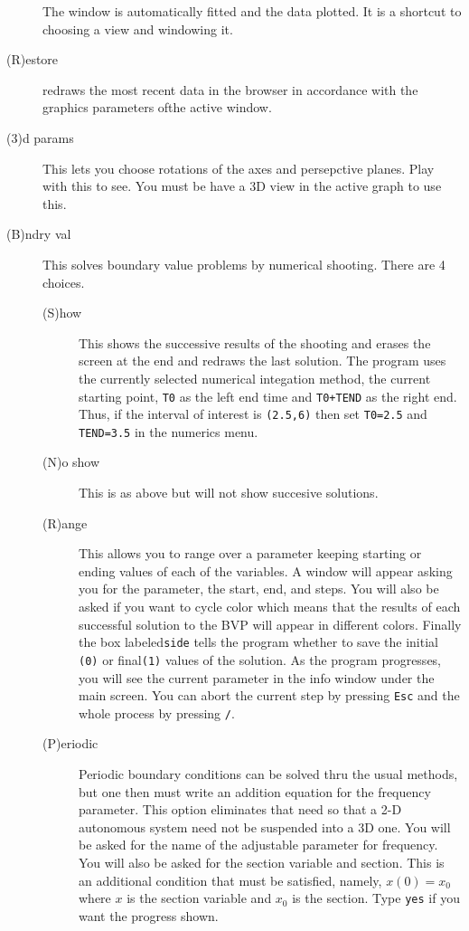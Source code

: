 \begin{description}
 The window is automatically fitted and the data plotted.  It is a
shortcut to choosing a view and windowing it.
\item[(R)estore] redraws the most recent data in the browser in accordance with the
 graphics parameters ofthe active window.
\item[(3)d params]  This lets you choose rotations of the axes and
persepctive  planes. 
 Play with this to see. You must be have a 3D view in the active graph
to use this.
\item[(B)ndry val]  This solves boundary value problems by numerical shooting. There
 are 4 choices.
\begin{description}
\item[(S)how]  This shows the successive results of the shooting and 
erases the screen at the end and redraws the last solution.  The program
 uses the currently selected numerical integation method, the current starting
 point, {\tt T0} as the left end time and  {\tt T0+TEND} as the right
end. 
 Thus, if the
 interval of interest is {\tt (2.5,6)} then set {\tt T0=2.5} and {\tt
TEND=3.5} in the numerics menu.  
\item[(N)o show] This is as above but will not show succesive solutions.
\item[(R)ange]  This allows you to range over a parameter keeping starting or
 ending values of each of the variables.  A window will appear asking you for
 the parameter, the start, end, and steps.  You will also be asked if you want 
to cycle color which means that the results of each successful solution to the
 BVP will appear in different colors. Finally the box labeled{\tt  side} tells the
 program whether to save the initial {\tt (0)} or final{\tt (1)}
values of 
the solution. 
 As the program progresses, you will see the current parameter in the info
 window under the main screen.  You can abort the current step by
pressing
 {\tt Esc} 
and the whole process by pressing {\tt /}. 
\item[(P)eriodic] Periodic boundary conditions can be solved thru the
usual methods, but one then must write an addition equation for the
frequency parameter.  This option eliminates that need so that a 2-D
autonomous system need not be suspended into a 3D one.  You will be
asked for the name of the adjustable parameter for frequency.  You
will also be asked for the section variable and section.  This is an additional
condition that must be satisfied, namely, $x(0)=x_0$ where $x$ is the
section variable and $x_0$ is the section.  Type {\tt yes} if you want
the progress shown.  
\end{description}
\end{description}


